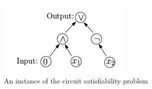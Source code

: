 \documentclass[paper=a4, fontsize=11pt]{scrartcl} %
\numberwithin{equation}{section} %
\numberwithin{figure}{section} %
\numberwithin{table}{section} %
\begin{document}
\begin{enumerate}
  
	\begin{figure}[!h]
		\centering
		\includegraphics[width=2.5in]{CSAT.png}
		\caption{An instance of the circuit satisfiability problem}
		\label{CSAT}
	\end{figure}  


\end{enumerate}


\end{document}
